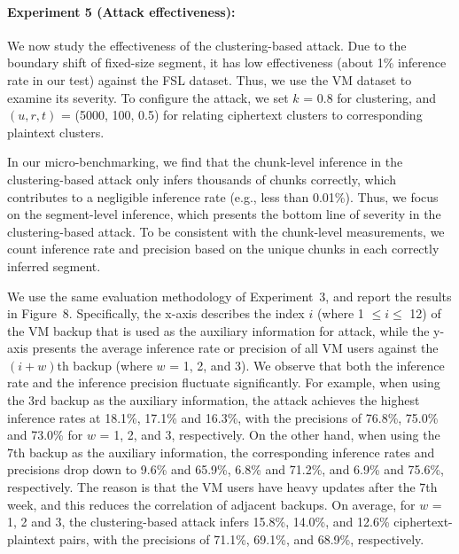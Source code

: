 \documentclass[bachelor]{thesis-uestc}
\begin{document}
\paragraph{Experiment 5 (Attack effectiveness):} We now study the
effectiveness of the clustering-based attack. Due to the boundary shift of
fixed-size segment, it has low effectiveness
(about 1\% inference rate in our test) against the FSL dataset.  Thus, we use
the VM dataset to examine its severity. To configure the attack, we set $k$ =
0.8 for clustering, and $(u, r, t)$ = (5000, 100, 0.5) for relating ciphertext
clusters to corresponding plaintext clusters.  

In our micro-benchmarking, we find that the chunk-level inference in the
clustering-based attack only infers thousands of chunks correctly, which
contributes to a negligible inference rate (e.g., less than 0.01\%).  
Thus, we focus on the
segment-level inference, which presents the bottom line of severity in the
clustering-based attack. To be consistent with the chunk-level measurements, we count inference rate and precision based
on the unique chunks in each correctly inferred segment. 

We use the same evaluation methodology of Experiment~3, and report the results
in Figure~8. Specifically, the x-axis describes the index $i$ (where 1 $\leq i \leq$
12) of the VM backup that is used as the auxiliary information for attack,
while the y-axis presents the average inference rate or precision of all VM
users against the $(i+w)$th backup (where $w$ = 1, 2, and 3). We observe that both the inference rate and the inference
precision fluctuate significantly. For example, when using the 3rd backup as
the auxiliary information, the attack achieves the highest inference rates at
18.1\%, 17.1\% and 16.3\%, with the precisions of 76.8\%, 75.0\% and 73.0\%
for $w$ = 1, 2, and 3, respectively. 
On the other hand, when using the 7th
backup as the auxiliary information, the corresponding inference rates and
precisions drop down to 9.6\% and 65.9\%, 6.8\% and 71.2\%, and 6.9\% and
75.6\%, respectively. The reason is that the VM users have heavy updates after
the 7th week, and this reduces the correlation  of adjacent backups. 
On
average, for $w$ = 1, 2 and 3, the clustering-based attack infers 15.8\%,
14.0\%, and 12.6\% ciphertext-plaintext pairs, with the precisions of 71.1\%,
69.1\%, and 68.9\%, respectively. 
\end{document}
